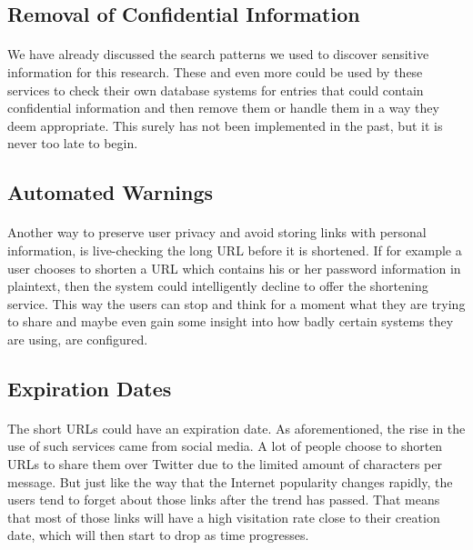 \documentclass[12pt]{article}
\begin{document}
\subsection{Removal of Confidential Information}

\paragraph{}
 We have already discussed the search patterns we used to discover sensitive information for this research. These and even more could be used by these services to check their own database systems for entries that could contain confidential information and then remove them or handle them in a way they deem appropriate. This surely has not been implemented in the past, but it is never too late to begin.

\subsection{Automated Warnings}

\paragraph{}
Another way to preserve user privacy and avoid storing links with personal information, is live-checking the long URL before it is shortened. If for example a user chooses to shorten a URL which contains his or her password information in plaintext, then the system could intelligently decline to offer the shortening service. This way the users can stop and think for a moment what they are trying to share and maybe even gain some insight into how badly certain systems they are using, are configured.

\subsection{Expiration Dates}

\paragraph{}
The short URLs could have an expiration date. As aforementioned, the rise in the use of such services came from social media. A lot of people choose to shorten URLs to share them over Twitter due to the limited amount of characters per message. But just like the way that the Internet popularity changes rapidly, the users tend to forget about those links after the trend has passed. That means that most of those links will have a high visitation rate close to their creation date, which will then start to drop as time progresses.
\end{document}

